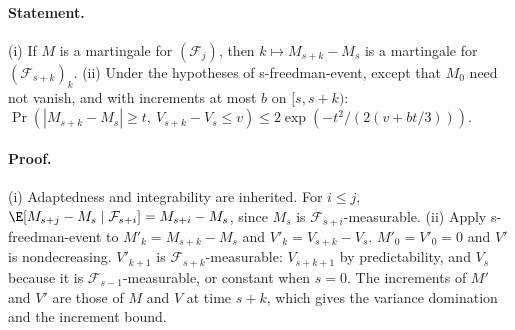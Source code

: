 \paragraph{Statement.} (i) If $M$ is a martingale for $(\mathcal F_j)$, then $k\mapsto M_{s+k}-M_s$ is a
martingale for $(\mathcal F_{s+k})_k$. (ii) Under the hypotheses of s-freedman-event, except that $M_0$ need
not vanish, and with increments at most $b$ on $[s,s+k)$:
$\Pr(|M_{s+k}-M_s|\geq t,\ V_{s+k}-V_s\leq v)\leq2\exp(-t^2/(2(v+bt/3)))$.
\paragraph{Proof.} (i) Adaptedness and integrability are inherited. For $i\leq j$,
$\E[M_{s+j}-M_s\mid\mathcal F_{s+i}]=M_{s+i}-M_s$, since $M_s$ is $\mathcal F_{s+i}$-measurable.
(ii) Apply s-freedman-event to $M'_k=M_{s+k}-M_s$ and $V'_k=V_{s+k}-V_s$. $M'_0=V'_0=0$ and $V'$ is
nondecreasing. $V'_{k+1}$ is $\mathcal F_{s+k}$-measurable: $V_{s+k+1}$ by predictability, and $V_s$ because
it is $\mathcal F_{s-1}$-measurable, or constant when $s=0$. The increments of $M'$ and $V'$ are those of
$M$ and $V$ at time $s+k$, which gives the variance domination and the increment bound.
